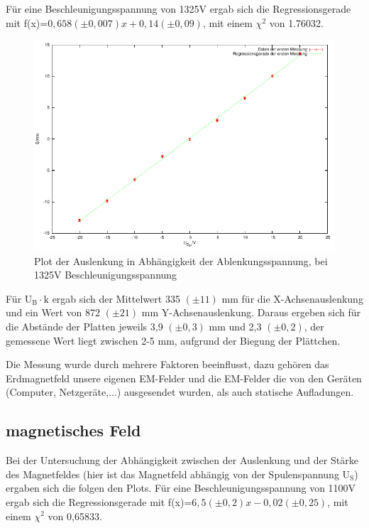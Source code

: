 \documentclass[12pt]{scrartcl}
\begin{document}
\newpage

Für eine Beschleunigungsspannung von 1325V ergab sich die Regressionsgerade mit f(x)=$0,658 (\pm 0,007) x  +0,14 (\pm 0,09)$, mit einem $\chi^2$ von 1.76032.

\begin{figure}[htbp] 
  \centering
    \includegraphics[scale = 1]{y_3.pdf}
  	\caption[Plot der Auslenkung in Abhängigkeit der Ablenkungsspannung, bei 1325V Beschleunigungsspannung]{Plot der Auslenkung in Abhängigkeit der Ablenkungsspannung, bei 1325V Beschleunigungsspannung}
  \label{fig:x_1}
\end{figure}

Für U$_\text{B} \cdot \text{k}$ ergab sich der Mittelwert 335 $(\pm 11)$ mm für die X-Achsenauslenkung und ein Wert von 872	$(\pm 21)$ mm Y-Achsenauslenkung.
Daraus ergeben sich für die Abstände der Platten jeweils 3,9 $(\pm 0,3)$ mm und 2,3	$(\pm 0,2)$, der gemessene Wert liegt zwischen 2-5 mm, aufgrund der Biegung der Plättchen.

Die Messung wurde durch mehrere Faktoren beeinflusst, dazu gehören das Erdmagnetfeld unsere eigenen EM-Felder und die EM-Felder die von den Geräten (Computer, Netzgeräte,...) ausgesendet wurden, als auch statische Aufladungen.

\subsection{magnetisches Feld}

Bei der Untersuchung der Abhängigkeit zwischen der Auslenkung und der Stärke des Magnetfeldes (hier ist das Magnetfeld abhängig von der Spulenspannung U$_\text{S}$) ergaben sich die folgen den Plots.
\newpage
Für eine Beschleunigungsspannung von 1100V ergab sich die Regressionsgerade mit f(x)=$6,5 (\pm 0,2) x  - 0,02 (\pm 0,25)$, mit einem $\chi^2$ von 0,65833.
\end{document}
